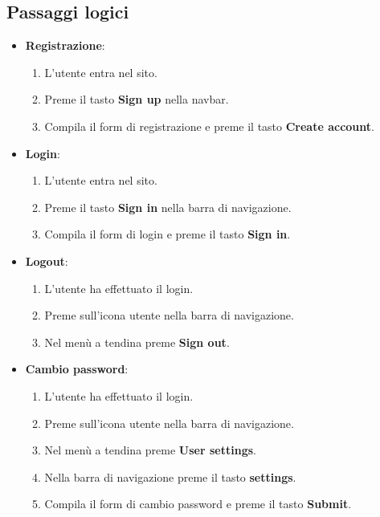 \subsection{Passaggi logici}

\begin{itemize}

  \item \textbf{Registrazione}:
        \begin{enumerate}
          \item L'utente entra nel sito.
          \item Preme il tasto \textbf{Sign up} nella navbar.
          \item Compila il form di registrazione e preme il tasto \textbf{Create account}.
        \end{enumerate}

  \item \textbf{Login}:
        \begin{enumerate}
          \item L'utente entra nel sito.
          \item Preme il tasto \textbf{Sign in} nella barra di navigazione.
          \item Compila il form di login e preme il tasto \textbf{Sign in}.
        \end{enumerate}

  \item \textbf{Logout}:
        \begin{enumerate}
          \item L'utente ha effettuato il login.
          \item Preme sull'icona utente nella barra di navigazione.
          \item Nel menù a tendina preme \textbf{Sign out}.
        \end{enumerate}

  \item \textbf{Cambio password}:
        \begin{enumerate}
          \item L'utente ha effettuato il login.
          \item Preme sull'icona utente nella barra di navigazione.
          \item Nel menù a tendina preme \textbf{User settings}.
          \item Nella barra di navigazione preme il tasto \textbf{settings}.
          \item Compila il form di cambio password e preme il tasto \textbf{Submit}.
        \end{enumerate}


\end{itemize}
